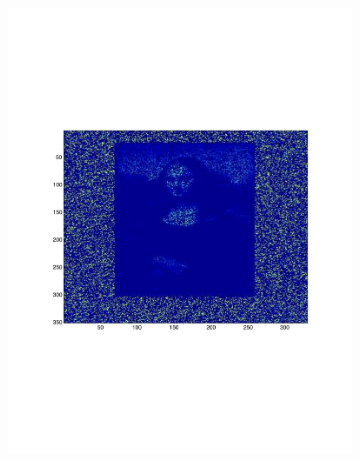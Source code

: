 \begin{figure}[h!tbp]
\begin{subfigure}[e]{0.3\textwidth}
        \includegraphics[width=\textwidth]{img/p5_m2_lam2.pdf}
    \end{subfigure}
    \begin{subfigure}[f]{0.3\textwidth}

\end{subfigure}
\end{figure}
